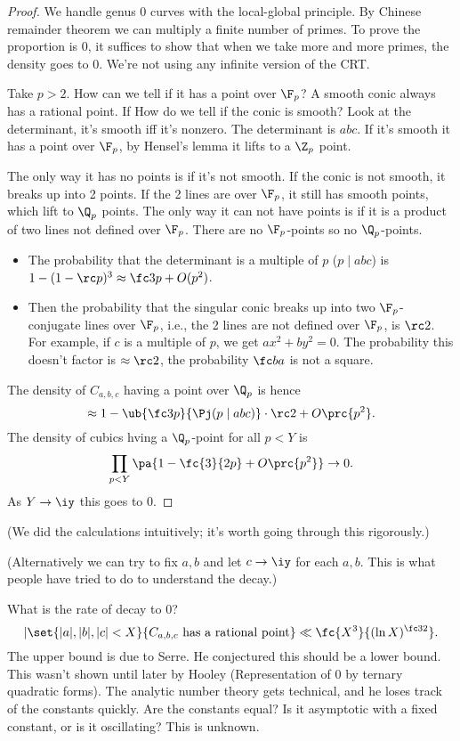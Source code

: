 \begin{proof}
We handle genus 0 curves with the local-global principle. By Chinese remainder theorem we can multiply a finite number of primes. To prove the proportion is 0, it suffices to show that when we take more and more primes, the density goes to 0. We're not using any infinite version of the CRT.

Take $p>2$. How can we tell if it has a point over $\F_p$? A smooth conic always has a rational point. If How do we tell if the conic is smooth? Look at the determinant, 
it's smooth iff it's nonzero. The determinant is $abc$. If it's smooth it has a point over $\F_p$, by Hensel's lemma it lifts to a $\Z_p$ point. 

The only way it has no points is if it's not smooth. If the conic is not smooth, it breaks up into 2 points. If the 2 lines are over $\F_p$, it still has smooth points, which lift to $\Q_p$ points. The only way it can not have points is if it is a product of two lines not defined over $\F_p$. There are no $\F_p$-points so no $\Q_p$-points. 

\begin{itemize}
\item
The probability that the determinant is a multiple of $p$ ($p\mid abc$) is $1-(1-\rc p)^3\approx \fc3p+O(p^2)$. 
\item
Then the probability 
that the singular conic breaks up into two $\F_p$-conjugate lines over $\F_p$, i.e., 
the 2 lines are not defined over $\F_p$, is $\rc2$. For example, if $c$ is a multiple of $p$, we get $ax^2+by^2 = 0$. The probability this doesn't factor is $\approx \rc2$, the probability $\fc ba$ is not a square.
\end{itemize}
The density of $C_{a,b,c}$ having a point over $\Q_p$ is hence
\[
\approx 1- \ub{\fc 3p}{\Pj(p\mid abc)}\cdot \rc2 + O\prc{p^2}.
\]
The density of cubics hving a $\Q_p$-point for all $p<Y$ is
\[
\prod_{p<Y} \pa{1-\fc{3}{2p}+O\prc{p^2}}\to 0.
\]
As $Y\to \iy$ this goes to 0.
\end{proof}
(We did the calculations intuitively; it's worth going through this rigorously.)

(Alternatively we can try to fix $a,b$ and let $c\to \iy$ for each $a,b$. This is what people have tried to do to understand the decay.)

What is the rate of decay to 0?
\[
|\set{|a|,|b|,|c|<X}{C_{a,b,c}\text{ has a rational point}}\ll \fc{X^3}{(\ln X)^{\fc 32}}.
\]
The upper bound is due to Serre. He conjectured this should be a lower bound. This wasn't shown until later by Hooley (Representation of 0 by ternary quadratic forms). The analytic number theory gets technical, and he loses track of the constants quickly.
Are the constants equal? Is it asymptotic with a fixed constant, or is it oscillating? This is unknown.

